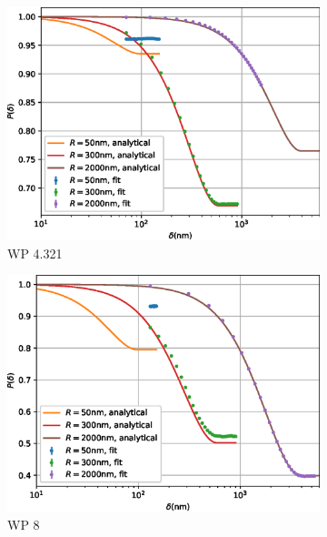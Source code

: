\begin{figure}[p]
\begin{subfigure}[b]{0.45\textwidth}
		\includegraphics[width=\textwidth]{simulation-plot-gauss-WSP-4.321}
		\caption{WP 4.321}
		\label{fig:simulation-plot-gauss-WSP-4.321}
	\end{subfigure}
	\hfill
	\begin{subfigure}[b]{0.45\textwidth}
		\centering
		\includegraphics[width=\textwidth]{simulation-plot-gauss-WSP-8}
		\caption{WP 8}
		\label{fig:simulation-plot-gauss-WSP-8}
	\end{subfigure}
	\centering
	\begin{subfigure}[b]{0.45\textwidth}
		\centering

\end{subfigure}
\end{figure}
